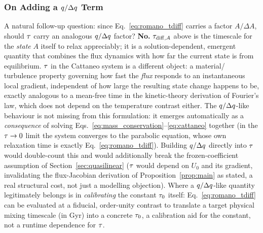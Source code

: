 \subsubsection{On Adding a $q/\Delta q$ Term}
\label{sec:no-q-over-dq}
A natural follow-up question: since Eq.~\eqref{eq:romano_tdiff} carries a
factor $A/\Delta A$, should $\tau$ carry an analogous
$q/\Delta q$ factor? \textbf{No.} $\tau_{{\rm diff},A}$
above is the timescale for the \emph{state} $A$ itself to relax
appreciably; it is a solution-dependent, emergent quantity that combines
the flux dynamics with how far the current state is from equilibrium.
$\tau$ in the Cattaneo system is a different object: a material/
turbulence property governing how fast the \emph{flux} responds to an
instantaneous local gradient, independent of how large the resulting
state change happens to be, exactly analogous to a mean-free time in the
kinetic-theory derivation of Fourier's law, which does not depend on the
temperature contrast either. The $q/\Delta q$-like behaviour is
not missing from this formulation: it emerges automatically as a
\emph{consequence} of solving Eqs.~\eqref{eq:mass_conservation}--\eqref{eq:cattaneo}
together (in the $\tau\to0$ limit the system converges to the
parabolic equation, whose own relaxation time is exactly
Eq.~\eqref{eq:romano_tdiff}). Building $q/\Delta q$ directly
into $\tau$ would double-count this and would additionally break the
frozen-coefficient assumption of Section~\ref{sec:quasilinear} ($\tau$
would depend on $U_0$ and its gradient, invalidating the flux-Jacobian
derivation of Proposition~\ref{prop:main} as stated, a real structural
cost, not just a modelling objection). Where a $q/\Delta q$-like
quantity legitimately belongs is in \emph{calibrating} the constant
$\tau_0$ itself: Eq.~\eqref{eq:romano_tdiff} can be evaluated at a
fiducial, order-unity contrast to translate a target physical mixing
timescale (in Gyr) into a concrete $\tau_0$, a calibration aid for
the constant, not a runtime dependence for $\tau$.

